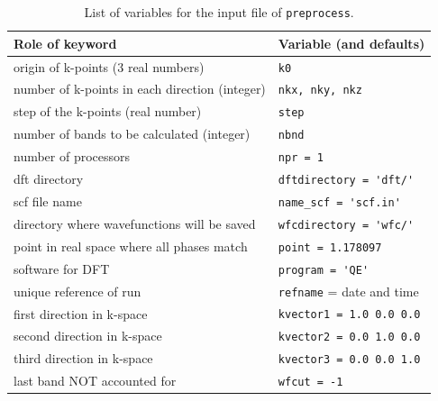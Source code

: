 \documentclass[a4paper,12pt]{report}
\begin{document}
\newpage

\begin{table}[h]
 \centering
 \caption{List of variables for the input file of \texttt{preprocess}.}

 \begin{tabularx}{\textwidth}{Xl}
 \textbf{Role of keyword}                     & \textbf{Variable (and defaults)}\\
\hline
 origin of k-points (3 real numbers)           & \verb|k0| \\
 number of k-points in each direction (integer)& \verb|nkx, nky, nkz| \\
 step of the k-points (real number)            & \verb|step| \\
 number of bands to be calculated (integer)    & \verb|nbnd| \\
 \hline
 number of processors                         & \verb|npr = 1| \\
 dft directory                                & \verb|dftdirectory = 'dft/'| \\
 scf file name                                & \verb|name_scf = 'scf.in'| \\
 directory where wavefunctions will be saved  & \verb|wfcdirectory = 'wfc/'| \\
 point in real space where all phases match   & \verb|point = 1.178097| \\
 software for DFT                             & \verb|program = 'QE'| \\
 unique reference of run                      & \verb|refname| = date and time \\
 first direction in k-space                   & \verb|kvector1 = 1.0 0.0 0.0| \\
 second direction in k-space                  & \verb|kvector2 = 0.0 1.0 0.0| \\
 third direction in k-space                   & \verb|kvector3 = 0.0 0.0 1.0| \\
 last band NOT accounted for                  & \verb|wfcut = -1| \\


 \hline
\end{tabularx}
 \label{tab:variables_preprocessing}
\end{table}
\end{document}
